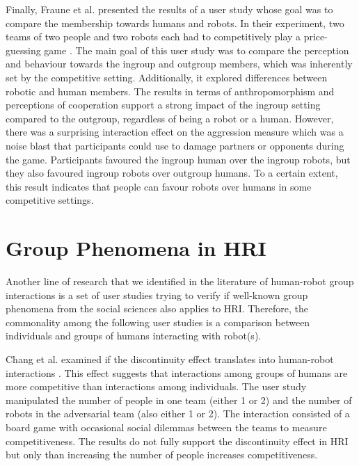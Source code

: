 Finally, Fraune et al. presented the results of a user study whose goal was to compare the membership towards humans and robots. In their experiment, two teams of two people and two robots each had to competitively play a price-guessing game \cite{fraune2017teammates}. The main goal of this user study was to compare the perception and behaviour towards the ingroup and outgroup members, which was inherently set by the competitive setting. Additionally, it explored differences between robotic and human members. The results in terms of anthropomorphism and perceptions of cooperation support a strong impact of the ingroup setting compared to the outgroup, regardless of being a robot or a human. However, there was a surprising interaction effect on the aggression measure which was a noise blast that participants could use to damage partners or opponents during the game. Participants favoured the ingroup human over the ingroup robots, but they also favoured ingroup robots over outgroup humans. To a certain extent, this result indicates that people can favour robots over humans in some competitive settings.



\section{Group Phenomena in HRI}
\label{sec:phenomena}
Another line of research that we identified in the literature of human-robot group interactions is a set of user studies trying to verify if well-known group phenomena from the social sciences also applies to HRI. Therefore, the commonality among the following user studies is a comparison between individuals and groups of humans interacting with robot(s).

Chang et al. examined if the discontinuity effect translates into human-robot interactions \cite{chang2012effect}. This effect suggests that interactions among groups of humans are more competitive than interactions among individuals. The user study manipulated the number of people in one team (either 1 or 2) and the number of robots in the adversarial team (also either 1 or 2). The interaction consisted of a board game with occasional social dilemmas between the teams to measure competitiveness. The results do not fully support the discontinuity effect in HRI but only than increasing the number of people increases competitiveness.

